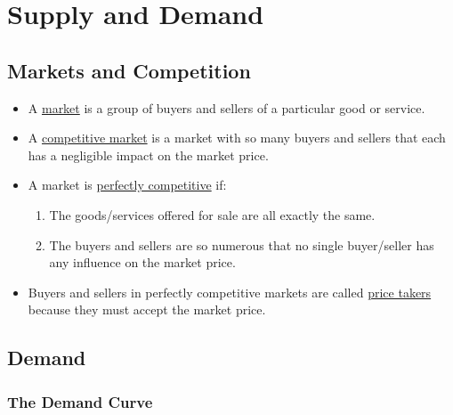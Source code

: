 \chapter{Supply and Demand}

\section{Markets and Competition}

	\begin{itemize}

	\item A \underline{market} is a group of buyers and sellers of a particular good or service.
	
	\item A \underline{competitive market} is a market with so many buyers and sellers that each has a negligible impact on the market price.
	
	\item A market is \underline{perfectly competitive} if:
	
		\begin{enumerate}
	
		\item The goods/services offered for sale are all exactly the same.
		
		\item The buyers and sellers are so numerous that no single buyer/seller has any influence on the market price.
	
		\end{enumerate}
	
	\item Buyers and sellers in perfectly competitive markets are called \underline{price takers} because they must accept the market price. 

	\end{itemize}

\section{Demand}

\subsection{The Demand Curve}

